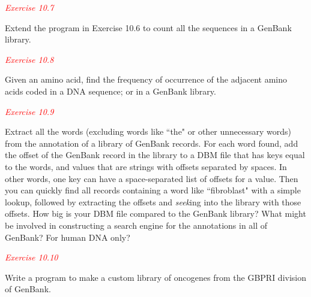 \textcolor{red}{\textit{Exercise 10.7}}
\begin{adjustwidth}{2em}{}
Extend the program in Exercise 10.6 to count all the sequences in a GenBank library.
\end{adjustwidth}

\textcolor{red}{\textit{Exercise 10.8}}
\begin{adjustwidth}{2em}{}
Given an amino acid, find the frequency of occurrence of the adjacent amino acids coded in a DNA sequence; or in a GenBank library.
\end{adjustwidth}

\textcolor{red}{\textit{Exercise 10.9}}
\begin{adjustwidth}{2em}{}
Extract all the words (excluding words like ``the" or other unnecessary words) from the annotation of a library of GenBank records. For each word found, add the offset of the GenBank record in the library to a DBM file that has keys equal to the words, and values that are strings with offsets separated by spaces. In other words, one key can have a space-separated list of offsets for a value. Then you can quickly find all records containing a word like ``fibroblast" with a simple lookup, followed by extracting the offsets and \textit{seek}ing into the library with those offsets. How big is your DBM file compared to the GenBank library? What might be involved in constructing a search engine for the annotations in all of GenBank? For human DNA only?
\end{adjustwidth}

\textcolor{red}{\textit{Exercise 10.10}}
\begin{adjustwidth}{2em}{}
Write a program to make a custom library of oncogenes from the GBPRI division of GenBank.
\end{adjustwidth}

